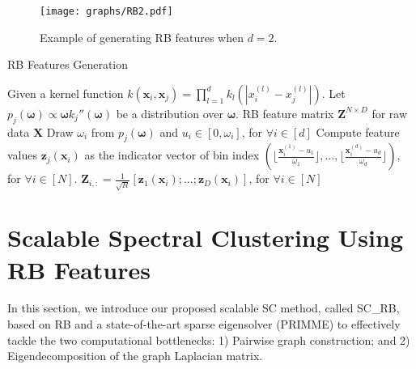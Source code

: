 \documentclass[sigconf]{acmart}
\newcommand{\1}{\boldsymbol{1}}
\newcommand{\bx}{\boldsymbol{x}}
\newcommand{\bz}{\boldsymbol{z}}
\newcommand{\omegab}{\boldsymbol{\omega}}
\newcommand{\bX}{\mathbf{X}}
\newcommand{\bZ}{\mathbf{Z}}
\newcommand{\0}{\boldsymbol{0}}
\begin{document}
\begin{figure}
    \centering
    \texttt{[image: graphs/RB2.pdf]}
\caption{Example of generating  RB features when $d=2$.}
    \label{fig:RB_gen}
\end{figure}

\begin{algorithm}[t]
    \caption{ RB Features Generation}
    \label{alg:RB}
    \begin{algorithmic}[1]
      Given a kernel function $k(\bx_i,\bx_j)=\prod_{l=1}^d k_l(|x_{i}^{(l)}-x_{j}^{(l)}|)$. Let $p_j(\omegab) \propto \omegab k_j''(\omegab)$ be a distribution over $\omegab$.
     RB feature matrix $\bZ^{N \times D}$ for raw data $\bX$
        \STATE Draw $\omega_{i}$ from $p_j(\omegab)$ and $u_{i}\in [0,\omega_{i}]$, for $\forall i\in[d]$ 
        \STATE Compute feature values $\bz_{j}(\bx_i)$ as the indicator vector of bin index $(\lfloor\frac{\bx_{i}^{(1)}-u_1}{\omega_1}\rfloor, ..., 
        \lfloor\frac{\bx_{i}^{(d)}-u_d}{\omega_d}\rfloor )$, for $\forall i\in[N]$.
    \ENDFOR
    \STATE $\bZ_{i,:}=\frac{1}{\sqrt{R}}[\bz_1(\bx_i);...;\bz_D(\bx_i)]$, for $\forall i\in[N]$
    \end{algorithmic}
\end{algorithm}


\section{Scalable Spectral Clustering Using RB Features} \label{sec: scalable sc_rb}
In this section, we introduce our proposed scalable SC method, called SC\_RB, based on RB and a state-of-the-art sparse eigensolver (PRIMME) to effectively tackle the two computational bottlenecks: 1) Pairwise graph construction; and 2) Eigendecomposition of the graph Laplacian matrix.
\end{document}
